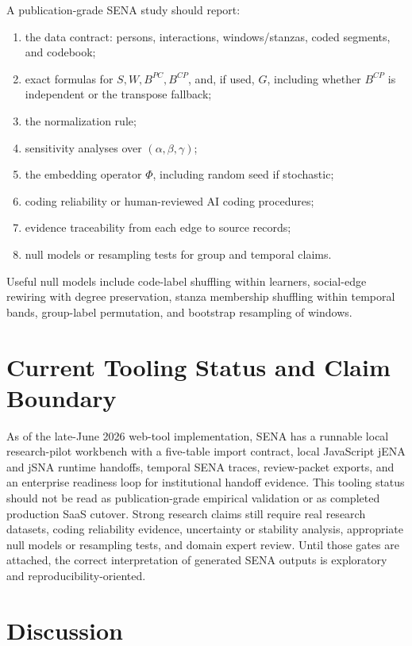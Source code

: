 \documentclass[11pt]{article}
\theoremstyle{definition}
\begin{document}
A publication-grade SENA study should report:
\begin{enumerate}
\item the data contract: persons, interactions, windows/stanzas, coded
segments, and codebook;
\item exact formulas for \(S,W,B^{PC},B^{CP}\), and, if used, \(G\), including
whether \(B^{CP}\) is independent or the transpose fallback;
\item the normalization rule;
\item sensitivity analyses over \((\alpha,\beta,\gamma)\);
\item the embedding operator \(\Phi\), including random seed if stochastic;
\item coding reliability or human-reviewed AI coding procedures;
\item evidence traceability from each edge to source records;
\item null models or resampling tests for group and temporal claims.
\end{enumerate}

Useful null models include code-label shuffling within learners, social-edge
rewiring with degree preservation, stanza membership shuffling within temporal
bands, group-label permutation, and bootstrap resampling of windows.

\section{Current Tooling Status and Claim Boundary}

As of the late-June 2026 web-tool implementation, SENA has a runnable local
research-pilot workbench with a five-table import contract, local JavaScript
jENA and jSNA runtime handoffs, temporal SENA traces, review-packet exports,
and an enterprise readiness loop for institutional handoff evidence. This
tooling status should not be read as publication-grade empirical validation or
as completed production SaaS cutover. Strong research claims still require real
research datasets, coding reliability evidence, uncertainty or stability
analysis, appropriate null models or resampling tests, and domain expert
review. Until those gates are attached, the correct interpretation of generated
SENA outputs is exploratory and reproducibility-oriented.

\section{Discussion}
\end{document}
